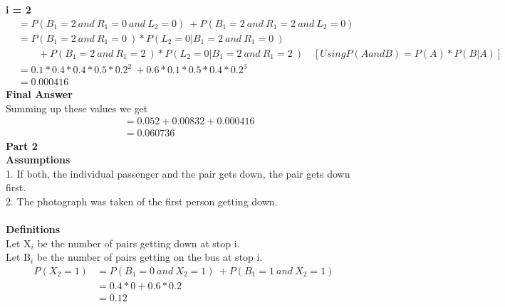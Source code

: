 \documentclass[12pt]{article}
\begin{document}
\textbf{i = 2 }\\
\begin{align}
 & = P(B_1=2\ and\ R_1=0\ and\ L_2= 0)\ +  P(B_1=2\ and\ R_1=2\ and\ L_2= 0)   \nonumber \\
 & = P(B_1=2\ and\ R_1=0\ ) * P(L_2=0 |B_1=2\ and\ R_1=0\ )    \nonumber \\
 & \qquad + P(B_1=2\ and\ R_1=2\ ) * P(L_2=0 |B_1=2\ and\ R_1=2\ )\quad [Using  P(A and B) = P(A) * P(B|A)] \nonumber \\
 & = 0.1*0.4*0.4*0.5*0.2^2\ + 0.6*0.1*0.5*0.4*0.2^3  \nonumber\\
 & = 0.000416 \nonumber
\end{align}
\textbf{Final Answer}\\
Summing up these values we get 
\begin{align}
    & = 0.052 + 0.00832 + 0.000416 \nonumber\\
    & = 0.060736 \nonumber
\end{align}
\textbf{Part 2}\\
\textbf{Assumptions}\\
1. If both, the individual passenger and the pair gets down, the pair gets down first.\\
2. The photograph was taken of the first person getting down.\\\\
\textbf{Definitions}\\
Let X$_i$ be the number of pairs getting down at stop i.\\
Let B$_i$ be the number of pairs getting on the bus at stop i.
\begin{align}
P(X_2=1) & = P(B_1=0\ and\ X_2=1)\ +  P(B_1=1\ and\ X_2=1)\  \nonumber \\
 & = 0.4*0 + 0.6*0.2 \nonumber \\
 & = 0.12 \nonumber
\end{align}
\end{document}
